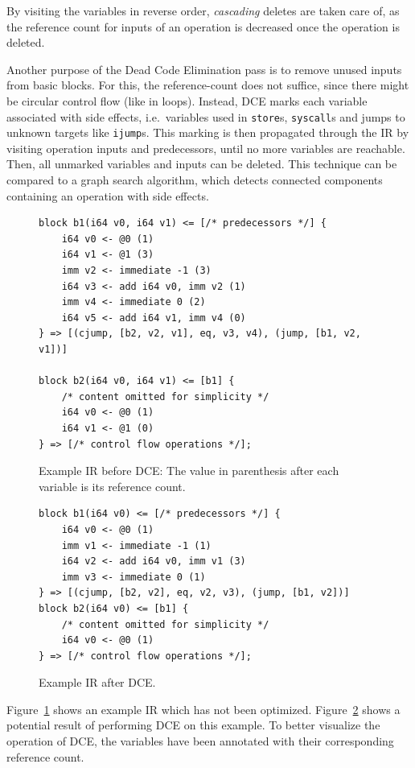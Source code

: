 \documentclass[course=eragp]{aspdoc}
\begin{document}
By visiting the variables in reverse order, \textit{cascading} deletes are taken care of, as the reference count for
inputs of an operation is decreased once the operation is deleted.

Another purpose of the Dead Code Elimination pass is to remove unused inputs from basic blocks. For this, the
reference-count does not suffice, since there might be circular control flow (like in loops). Instead, DCE marks each
variable associated with side effects, i.e.\ variables used in \texttt{store}s, \texttt{syscall}s and jumps to unknown
targets like \texttt{ijump}s. This marking is then propagated through the IR by visiting operation inputs and
predecessors, until no more variables are reachable. Then, all unmarked variables and inputs can be deleted. This
technique can be compared to a graph search algorithm, which detects connected components containing an operation with
side effects.

\begin{figure}[H]
    \centering
    \begin{lstlisting}[]
block b1(i64 v0, i64 v1) <= [/* predecessors */] {
    i64 v0 <- @0 (1)
    i64 v1 <- @1 (3)
    imm v2 <- immediate -1 (3)
    i64 v3 <- add i64 v0, imm v2 (1)
    imm v4 <- immediate 0 (2)
    i64 v5 <- add i64 v1, imm v4 (0)
} => [(cjump, [b2, v2, v1], eq, v3, v4), (jump, [b1, v2, v1])]

block b2(i64 v0, i64 v1) <= [b1] {
    /* content omitted for simplicity */
    i64 v0 <- @0 (1)
    i64 v1 <- @1 (0)
} => [/* control flow operations */];
\end{lstlisting}
    \caption{Example IR before DCE: The value in parenthesis after each variable is its reference count.}\label{fig:dce_example_before}
\end{figure}

\begin{figure}[H]
    \centering
    \begin{lstlisting}[]
block b1(i64 v0) <= [/* predecessors */] {
    i64 v0 <- @0 (1)
    imm v1 <- immediate -1 (1)
    i64 v2 <- add i64 v0, imm v1 (3)
    imm v3 <- immediate 0 (1)
} => [(cjump, [b2, v2], eq, v2, v3), (jump, [b1, v2])]
block b2(i64 v0) <= [b1] {
    /* content omitted for simplicity */
    i64 v0 <- @0 (1)
} => [/* control flow operations */];
\end{lstlisting}
    \caption{Example IR after DCE.}\label{fig:dce_example_after}
\end{figure}

Figure~\ref{fig:dce_example_before} shows an example IR which has not been optimized. Figure~\ref{fig:dce_example_after}
shows a potential result of performing DCE on this example. To better visualize the operation of DCE, the variables
have been annotated with their corresponding reference count.
\end{document}
